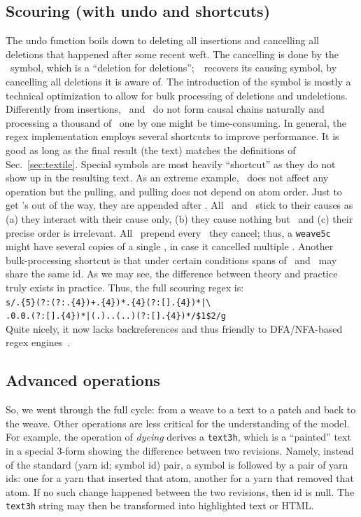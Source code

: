 \documentclass{sig-alternate}
\begin{document}
\subsection{Scouring (with undo and shortcuts)}	\label{sec:undo}
The undo function boils down to deleting all insertions and cancelling all deletions that happened after some recent weft.
The cancelling is done by the \cnc ~symbol, which is a ``deletion for deletions'';~\cnc ~recovers its causing symbol, by cancelling all deletions it is aware of.
The introduction of the symbol is mostly a technical optimization to allow for bulk processing of deletions and undeletions. 
Differently from insertions, \bsp ~and \cnc ~do not form causal chains naturally and processing a thousand of \bsp ~one by one might be time-consuming.
In general, the regex implementation employs several shortcuts to improve performance.
It is good as long as the final result (the text) matches the definitions of Sec.~\ref{sec:textile}.
Special symbols are most heavily ``shortcut'' as they do not show up in the resulting text.
As an extreme example, \zero ~does not affect any operation but the pulling, and pulling does not depend on atom order.
Just to get \zero's out of the way, they are appended after \eoa.
All \bsp ~and \cnc ~stick to their causes as (a) they interact with their cause only, (b) they cause nothing but \zero ~and (c) their precise order is irrelevant.
All \cnc ~prepend every \bsp ~they cancel; thus, a {\tt weave5c} might have  several copies of a single \cnc, in case it cancelled multiple \bsp.
Another bulk-processing shortcut is that under certain conditions spans of \bsp ~and \cnc ~may share the same id.
As we may see, the difference between theory and practice truly exists in practice.
Thus, the full scouring regex is: \\
{\small \verb`s/.{5}(?:(?:`\cnc\verb`.{4})+`\bsp\verb`.{4})*`\bsp\verb`.{4}(?:[`\bsp\verb``\cnc\verb`].{4})*|\`\\
\verb`.0.0.(?:[`\bsp\zero\cnc\verb`].{4})*|`\verb`(.)..(..)(?:[`\bsp\verb``\cnc\verb`].{4})*/$1$2/g`}\\
Quite nicely, it now lacks backreferences and thus friendly to DFA/NFA-based regex engines~\cite{re2}.

\subsection{Advanced operations}

So, we went through the full cycle: from a weave to a text to a patch and back to the weave.
Other operations are less critical for the understanding of the model.
For example, the operation of \emph{dyeing} derives a {\tt text3h}, which is a ``painted'' text in a special 3-form showing the difference between two revisions. 
Namely, instead of the standard (yarn id; symbol id) pair, a symbol is followed by a pair of yarn ids: one for a yarn that inserted that atom, another for a yarn that removed that atom.
If no such change happened between the two revisions, then id is null.
The {\tt text3h} string may then be transformed into highlighted text or HTML.
\end{document}
